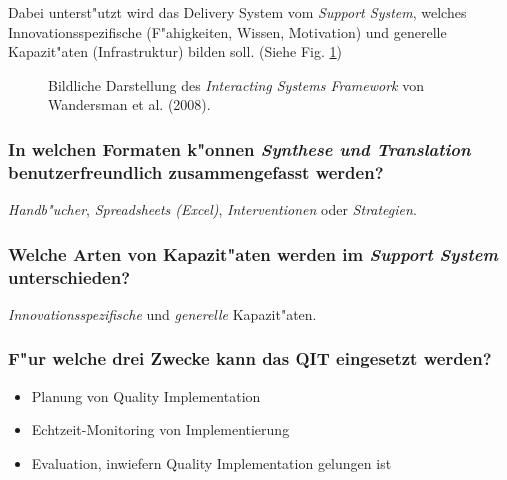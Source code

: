 \noindent Dabei unterst"utzt wird das Delivery System vom \emph{Support System}, welches Innovationsspezifische (F"ahigkeiten, Wissen, Motivation) und generelle Kapazit"aten (Infrastruktur) bilden soll. (Siehe Fig. \ref{fig:meyers1})
\begin{figure}[hb!]
        \begin{center}
        \end{center}
        \caption{Bildliche Darstellung des \emph{Interacting Systems Framework} von Wandersman et al. (2008).}
        \label{fig:meyers1}
\end{figure}

\subsubsection{In welchen Formaten k"onnen \emph{Synthese und Translation} benutzerfreundlich zusammengefasst werden?}
\emph{Handb"ucher}, \emph{Spreadsheets (Excel)}, \emph{Interventionen} oder \emph{Strategien}.

\subsubsection{Welche Arten von Kapazit"aten werden im \emph{Support System} unterschieden?}
\emph{Innovationsspezifische} und \emph{generelle} Kapazit"aten.

\subsubsection{F"ur welche drei Zwecke kann das QIT eingesetzt werden?}
\begin{itemize}
        \item Planung von Quality Implementation
        \item Echtzeit-Monitoring von Implementierung
        \item Evaluation, inwiefern Quality Implementation gelungen ist
\end{itemize}

